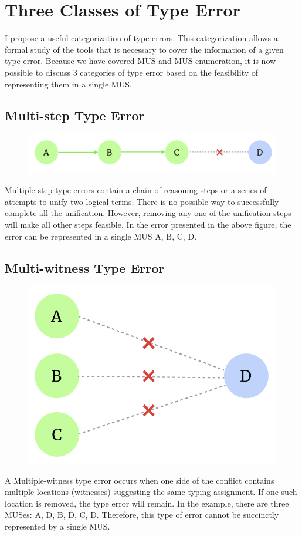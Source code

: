 \section{Three Classes of Type Error}

I propose a useful categorization of type errors. This categorization allows a formal study of the tools that is necessary to cover the information of a given type error.  Because we have covered MUS and MUS enumeration, it is now possible to discuss 3 categories of type error based on the feasibility of representing them in a single MUS.

\subsection{Multi-step Type Error}
\begin{figure}[hbt]
  \includegraphics[width=0.5\linewidth]{Multi-step}
  \caption{}
\end{figure}

Multiple-step type errors contain a chain of reasoning steps or a series of attempts to unify two logical terms. There is no possible way to successfully complete all the unification. However, removing any one of the unification steps will make all other steps feasible. In the error presented in the above figure, the error can be represented in a single MUS {A, B, C, D}.

\subsection{Multi-witness Type Error}
\begin{figure}[hbt]
  \includegraphics[width=0.5\linewidth]{Multi-witness}
  \caption{}
\end{figure}
A Multiple-witness type error occurs when one side of the conflict contains multiple locations (witnesses) suggesting the same typing assignment. If one such location is removed, the type error will remain. In the example, there are three MUSes: {A, D}, {B, D}, {C, D}. Therefore, this type of error cannot be succinctly represented by a single MUS.

